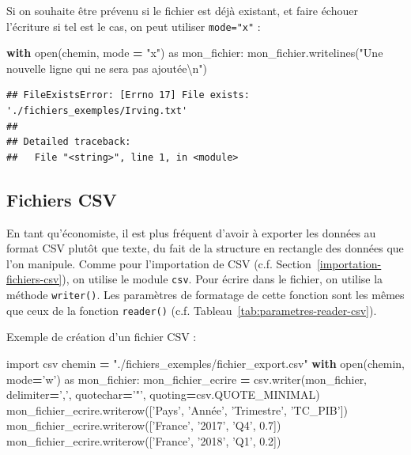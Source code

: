 \documentclass[12pt,]{book}
\newenvironment{Shaded}{\begin{snugshade}}{\end{snugshade}}
\newcommand{\FloatTok}[1]{\textcolor[rgb]{0.00,0.00,0.81}{#1}}
\newcommand{\CharTok}[1]{\textcolor[rgb]{0.31,0.60,0.02}{#1}}
\newcommand{\StringTok}[1]{\textcolor[rgb]{0.31,0.60,0.02}{#1}}
\newcommand{\ImportTok}[1]{#1}
\newcommand{\ControlFlowTok}[1]{\textcolor[rgb]{0.13,0.29,0.53}{\textbf{#1}}}
\newcommand{\OperatorTok}[1]{\textcolor[rgb]{0.81,0.36,0.00}{\textbf{#1}}}
\newcommand{\BuiltInTok}[1]{#1}
\newcommand{\NormalTok}[1]{#1}
\numberwithin{equation}{section}
\numberwithin{countremarque}{section}
\begin{document}
Si on souhaite être prévenu si le fichier est déjà existant, et faire
échouer l'écriture si tel est le cas, on peut utiliser \texttt{mode="x"}
:

\begin{Shaded}
\begin{Highlighting}[]
\ControlFlowTok{with} \BuiltInTok{open}\NormalTok{(chemin, mode }\OperatorTok{=} \StringTok{"x"}\NormalTok{) }\ImportTok{as}\NormalTok{ mon_fichier:}
\NormalTok{  mon_fichier.writelines(}\StringTok{"Une nouvelle ligne qui ne sera pas ajoutée}\CharTok{\textbackslash{}n}\StringTok{"}\NormalTok{)}
\end{Highlighting}
\end{Shaded}

\begin{lstlisting}
## FileExistsError: [Errno 17] File exists: './fichiers_exemples/Irving.txt'
## 
## Detailed traceback: 
##   File "<string>", line 1, in <module>
\end{lstlisting}

\subsection{Fichiers CSV}\label{fichiers-csv}

En tant qu'économiste, il est plus fréquent d'avoir à exporter les
données au format CSV plutôt que texte, du fait de la structure en
rectangle des données que l'on manipule. Comme pour l'importation de CSV
(c.f. Section~\ref{importation-fichiers-csv}), on utilise le module
\texttt{csv}. Pour écrire dans le fichier, on utilise la méthode
\texttt{writer()}. Les paramètres de formatage de cette fonction sont
les mêmes que ceux de la fonction \texttt{reader()} (c.f.
Tableau~\ref{tab:parametres-reader-csv}).

Exemple de création d'un fichier CSV :

\begin{Shaded}
\begin{Highlighting}[]
\ImportTok{import}\NormalTok{ csv}
\NormalTok{chemin }\OperatorTok{=} \StringTok{"./fichiers_exemples/fichier_export.csv"}
\ControlFlowTok{with} \BuiltInTok{open}\NormalTok{(chemin, mode}\OperatorTok{=}\StringTok{'w'}\NormalTok{) }\ImportTok{as}\NormalTok{ mon_fichier:}
\NormalTok{    mon_fichier_ecrire }\OperatorTok{=}\NormalTok{ csv.writer(mon_fichier, delimiter}\OperatorTok{=}\StringTok{','}\NormalTok{,}
\NormalTok{                                    quotechar}\OperatorTok{=}\StringTok{'"'}\NormalTok{,}
\NormalTok{                                    quoting}\OperatorTok{=}\NormalTok{csv.QUOTE_MINIMAL)}
\NormalTok{    mon_fichier_ecrire.writerow([}\StringTok{'Pays'}\NormalTok{, }\StringTok{'Année'}\NormalTok{, }\StringTok{'Trimestre'}\NormalTok{, }\StringTok{'TC_PIB'}\NormalTok{])}
\NormalTok{    mon_fichier_ecrire.writerow([}\StringTok{'France'}\NormalTok{, }\StringTok{'2017'}\NormalTok{, }\StringTok{'Q4'}\NormalTok{, }\FloatTok{0.7}\NormalTok{])}
\NormalTok{    mon_fichier_ecrire.writerow([}\StringTok{'France'}\NormalTok{, }\StringTok{'2018'}\NormalTok{, }\StringTok{'Q1'}\NormalTok{, }\FloatTok{0.2}\NormalTok{])}
\end{Highlighting}
\end{Shaded}
\end{document}
